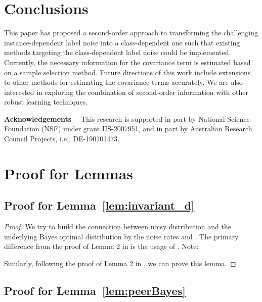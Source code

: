\documentclass[final]{cvpr}
\begin{document}
 \section{Conclusions}
\vspace{-2pt}
This paper has proposed a second-order approach to transforming the challenging instance-dependent label noise into a class-dependent one such that existing methods targeting the class-dependent label noise could be implemented.
Currently, the necessary information for the covariance term is estimated based on a sample selection method.
Future directions of this work include extensions to other methods for estimating the covariance terms accurately.
We are also interested in exploring the combination of second-order information with other robust learning techniques.

\noindent\textbf{Acknowledgements}~~
This research is supported in part by National Science Foundation (NSF) under grant IIS-2007951, and in part by Australian Research Council Projects, i.e., DE-190101473.
 
\clearpage
\newpage




\clearpage
\newpage
\appendix
\onecolumn
{}

\section{Proof for Lemmas}



\subsection{Proof for Lemma~\ref{lem:invariant_d}}\label{proof:invariant_d}

\begin{proof}

We try to build the connection between noisy distribution  and the underlying Bayes optimal distribution  by the noise rates  and . 
The primary difference from the proof of Lemma 2 in \cite{liu2019peer} is the usage of .
Note:

Similarly, following the proof of Lemma 2 in \cite{liu2019peer}, we can prove this lemma.
\end{proof}

\subsection{Proof for Lemma~\ref{lem:peerBayes}}\label{proof:peerBayes}
\end{document}
